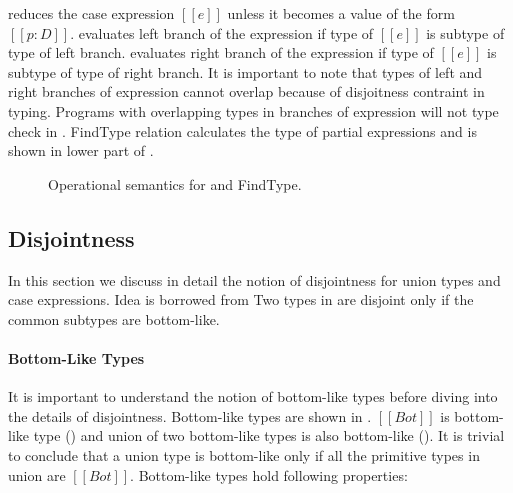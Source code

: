  reduces the case expression $[[e]]$ unless it becomes a value of the form $[[p:D]]$.
 evaluates left branch of the \typeof expression if type of $[[e]]$ is subtype
of type of left branch.
 evaluates right branch of the \typeof expression if type of $[[e]]$ is subtype
of type of right branch.
It is important to note that types of left and right branches of \typeof expression cannot overlap
because of disjoitness contraint in typing. Programs with overlapping types in branches of \typeof
expression will not type check in \cal. FindType relation calculates the type of partial expressions
and is shown in lower part of .

\begin{figure}[t]
  \begin{small}
    \centering
  \end{small}
  \begin{small}
    \centering
  \end{small}
  \caption{Operational semantics for \dut and FindType.}
  \label{fig:union:os}
\end{figure}

\subsection{Disjointness}
\label{sec:union:disj}
In this section we discuss in detail the notion of disjointness for union types and case expressions.
Idea is borrowed from  Two types in \cal are disjoint
only if the common subtypes are bottom-like. 

\paragraph{Bottom-Like Types}
It is important to understand the notion of bottom-like types before diving into the details 
of disjointness. Bottom-like types are shown in . $[[Bot]]$ is bottom-like 
type () and union of two bottom-like types is also bottom-like ().
It is trivial to conclude that a union type is bottom-like only if all the primitive types in 
union are $[[Bot]]$. Bottom-like types hold following properties:

